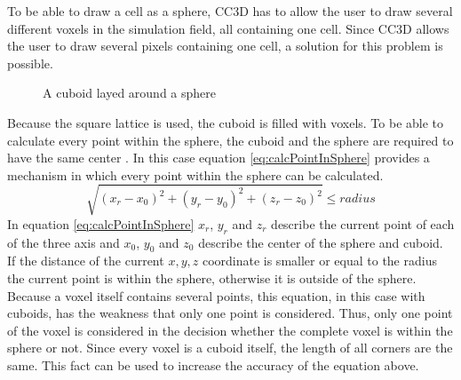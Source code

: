 To be able to draw a cell as a sphere, \ac{CC3D} has to allow the user to draw several different voxels in the simulation field, all containing one cell. Since \ac{CC3D} allows the user to draw several pixels containing one cell, a solution for this problem is possible.


\begin{figure}[ht]
\begin{center}
\caption[A cuboid layed around a sphere]{A cuboid layed around a sphere}
\label{tikz:SphereInCube}
\end{center}
\end{figure}


Because the square lattice is used, the cuboid is filled with voxels. To be able to calculate every point within the sphere, the cuboid and the sphere are required to have the same center \cite{REF}. In this case equation \ref{eq:calcPointInSphere} provides a mechanism in which every point within the sphere can be calculated.
\begin{equation}\label{eq:calcPointInSphere}
\sqrt{(x_{r}-x_{0})^2 + (y_{r}-y_{0})^2 + (z_{r}-z_{0})^2} \leq radius
\end{equation}
In equation \ref{eq:calcPointInSphere} $x_{r}$, $y_{r}$ and $z_{r}$ describe the current point of each of the three axis and $x_{0}$, $y_{0}$ and $z_{0}$ describe the center of the sphere and cuboid. If the distance of the current $x, y, z$ coordinate is smaller or equal to the radius the current point is within the sphere, otherwise it is outside of the sphere.
Because a voxel itself contains several points, this equation, in this case with cuboids, has the weakness that only one point is considered. Thus, only one point of the voxel is considered in the decision whether the complete voxel is within the sphere or not. Since every voxel is a cuboid itself, the length of all corners are the same. This fact can be used to increase the accuracy  of the equation above.

